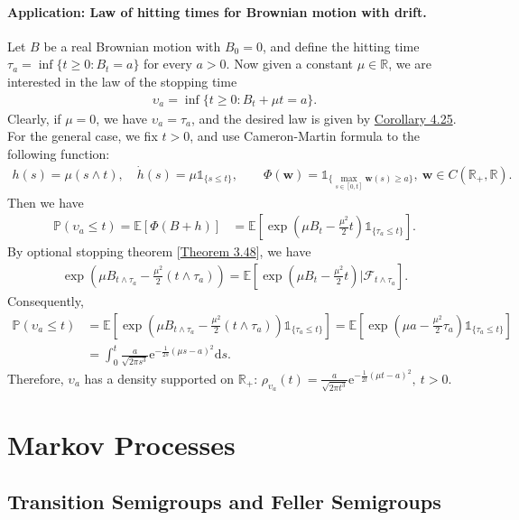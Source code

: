 \documentclass{article}
\numberwithin{equation}{section}
\newcommand{\e}{\mathrm{e}}
\newcommand{\E}{\mathbb{E}}
\newcommand{\bfw}{\mathbf{w}}
\renewcommand{\P}{\mathbb{P}}
\renewcommand{\d}{\mathrm{d}}
\theoremstyle{plain}
\theoremstyle{definition}
\begin{document}
\paragraph{Application: Law of hitting times for Brownian motion with drift.} Let $B$ be a real Brownian motion with $B_0=0$, and define the hitting time $\tau_a=\inf\{t\geq 0:B_t=a\}$ for every $a>0$. Now given a constant $\mu\in\mathbb{R}$, we are interested in the law of the stopping time
\begin{align*}
	\upsilon_a=\inf\{t\geq 0:B_t+\mu t=a\}.
\end{align*}
Clearly, if $\mu=0$, we have $\upsilon_a=\tau_a$, and the desired law is given by \hyperref[cor:4.25]{Corollary 4.25}. For the general case, we fix $t>0$, and use Cameron-Martin formula to the following function:
\begin{align*}
	h(s)=\mu(s\wedge t),\quad \dot{h}(s)=\mu\mathds{1}_{\{s\leq t\}},\qquad\Phi(\bfw)=\mathds{1}_{\{\max_{s\in[0,t]}\bfw(s)\geq a\}},\ \bfw\in C(\mathbb{R}_+,\mathbb{R}).
\end{align*}
Then we have
\begin{align*}
	\P\left(\upsilon_a\leq t\right)=\E\left[\Phi(B+h)\right]&=\E\left[\exp\left(\mu B_t - \frac{\mu^2}{2}t\right)\mathds{1}_{\{\tau_a\leq t\}}\right].
\end{align*}
By optional stopping theorem [\hyperref[thm:3.48]{Theorem 3.48}], we have
\begin{align*}
	\exp\left(\mu B_{t\wedge\tau_a} - \frac{\mu^2}{2}(t\wedge\tau_a)\right)=\E\left[\exp\left(\mu B_t - \frac{\mu^2}{2}t\right)|\mathscr{F}_{t\wedge\tau_a}\right].
\end{align*}
Consequently,
\begin{align*}
	\P\left(\upsilon_a\leq t\right)
	&=\E\left[\exp\left(\mu B_{t\wedge\tau_a} - \frac{\mu^2}{2}(t\wedge\tau_a)\right)\mathds{1}_{\{\tau_a\leq t\}}\right]=\E\left[\exp\left(\mu a - \frac{\mu^2}{2}\tau_a\right)\mathds{1}_{\{\tau_a\leq t\}}\right]\\
	&=\int_0^t\frac{a}{\sqrt{2\pi s^3}}\e^{-\frac{1}{2s}(\mu s-a)^2}\d s.
\end{align*}
Therefore, $\upsilon_a$ has a density supported on $\mathbb{R}_+$: $\rho_{\upsilon_a}(t)=\displaystyle\frac{a}{\sqrt{2\pi t^3}}\e^{-\frac{1}{2t}(\mu t-a)^2},\ t>0$.

\newpage
\section{Markov Processes}
\subsection{Transition Semigroups and Feller Semigroups}
\end{document}
